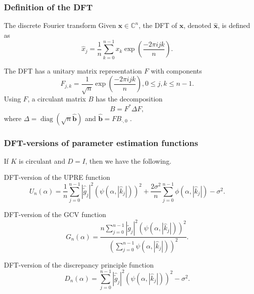 \documentclass[t]{beamer}
\newcommand{\noiseSD}{\sigma}	%
\newcommand{\gnoise}{\widetilde{g}}	%
\newcommand{\ctrans}{*}	%
\DeclareMathOperator{\diag}{diag}	%
\newcommand{\regparam}{\alpha}
\newcommand{\filt}{\phi}
\newcommand{\mfilt}{\psi}
\newcommand{\U}{U}	%
\newcommand{\GCV}{G}	%
\newcommand{\D}{D}	%
\begin{document}
\begin{frame}
\frametitle{Definition of the DFT}
\begin{block}{The discrete Fourier transform}
Given $\mathbf{x} \in \mathbb{C}^n$, the DFT of $\mathbf{x}$, denoted $\widehat{\mathbf{x}}$, is defined as
\[\widehat{x}_j = \frac{1}{n} \sum_{k=0}^{n-1} x_k\exp\left(\frac{-2\pi{ijk}}{n}\right).\]
\end{block}
The DFT has a unitary matrix representation $F$ with components
\[F_{j,k} = \frac{1}{\sqrt{n}}\exp\left(\frac{-2\pi{ijk}}{n}\right), 0 \leq j,k \leq n-1.\]
Using $F$, a circulant matrix $B$ has the decomposition
\[B = F^\ctrans\Delta{F},\]
where $\Delta  = \diag(\sqrt{n}\widehat{\mathbf{b}})$ and $\widehat{\mathbf{b}} = FB_{\cdot,0}$ \cite[p.~69]{Vogel:2002}.
\end{frame}

\begin{frame}
\frametitle{DFT-versions of parameter estimation functions}
If $K$ is circulant and $D = I$, then we have the following.
\begin{block}{DFT-version of the UPRE function}
\[\U_n(\regparam) = \frac{1}{n}\sum_{j = 0}^{n-1} |\widehat{\gnoise}_j|^2(\mfilt(\regparam,|\widehat{k}_j|))^2 + \frac{2\noiseSD^2}{n}\sum_{j = 0}^{n-1} \filt(\regparam,|\widehat{k}_j|) - \noiseSD^2.\]
\end{block}
\begin{block}{DFT-version of the GCV function}
\[\GCV_n(\regparam) = \frac{n \sum_{j = 0}^{n-1} |\widehat{\gnoise}_j|^2(\mfilt(\regparam,|\widehat{k}_j|))^2}{(\sum_{j = 0}^{n-1} \mfilt(\regparam,|\widehat{k}_j|))^2}.\]
\end{block}
\begin{block}{DFT-version of the discrepancy principle function}
\[\D_n(\regparam) = \sum_{j = 0}^{n-1} |\widehat{\gnoise}_j|^2(\mfilt(\regparam,|\widehat{k}_j|))^2 - \noiseSD^2.\]
\end{block}
\end{frame}
\end{document}
